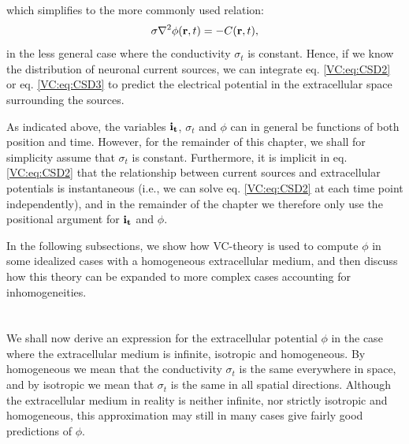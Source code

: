which simplifies to the more commonly used relation:
\begin{equation}
\sigma \nabla^2\phi({\bf r}, t) = - C({\bf r}, t),
\label{VC:eq:CSD3}
\end{equation}
in the less general case where the conductivity $\sigma_t$ is constant. Hence, if we know the distribution of neuronal current sources, we can integrate eq. \ref{VC:eq:CSD2} or eq. \ref{VC:eq:CSD3} to predict the electrical potential in the extracellular space surrounding the sources. 

As indicated above, the variables ${\bf i_t}$, $\sigma_t$ and $\phi$ can in general be functions of both position and time. However, for the remainder of this chapter, we shall for simplicity assume that $\sigma_t$ is constant. Furthermore, it is implicit in eq. \ref{VC:eq:CSD2} that the relationship between current sources and extracellular potentials is instantaneous (i.e., we can solve eq.  \ref{VC:eq:CSD2} at each time point independently), and in the remainder of the chapter we therefore only use the positional argument for ${\bf i_t}$ and $\phi$. 

In the following subsections, we show how VC-theory is used to compute $\phi$ in some idealized cases with a homogeneous extracellular medium, and then discuss how this theory can be expanded to more complex cases accounting for inhomogeneities. 


\section{}
\label{sec:VC:isohomo}

We shall now derive an expression for the extracellular potential $\phi$ in the case where the extracellular medium is infinite, isotropic and homogeneous. By homogeneous we mean that the conductivity $\sigma_t$ is the same everywhere in space, and by isotropic we mean that $\sigma_t$ is the same in all spatial directions. Although the extracellular medium in reality is neither infinite, nor strictly isotropic and homogeneous, this approximation may still in many cases give fairly good predictions of $\phi$.


\subsection{}
\label{sec:VC:pointsource}

